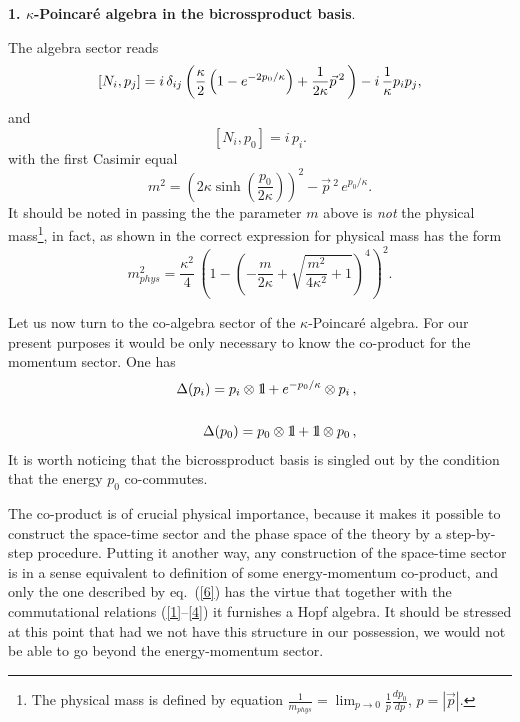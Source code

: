 \documentclass [prd,twocolumn,nofootinbib,showpacs]  {revtex4}
\def\bbbone{{\mathchoice {\rm 1\mskip-4mu l} {\rm 1\mskip-4mu l}
{\rm 1\mskip-4.5mu l} {\rm 1\mskip-5mu l}}}
\begin{document}
\noindent
{\bf 1. $\kappa$-Poincar\'e algebra in the bicrossproduct basis}.
\newline

The algebra sector reads
\begin{equation}\label{3}
   \left[N_{i}, p_{j}\right] = i\,  \delta_{ij}
 \left( {\kappa\over 2} \left(
 1 -e^{-2{p_{0}/ \kappa}}
\right) + {1\over 2\kappa} \vec{p}\,{}^{ 2}\, \right) - i\,
{1\over \kappa} p_{i}p_{j} ,
\end{equation}
and
\begin{equation}\label{4}
  \left[N_{i},p_{0}\right] = i\, p_{i}.
\end{equation}
with the first Casimir equal
\begin{equation}\label{5}
 m^2 = \left(2\kappa \sinh \left(\frac{p_0}{2\kappa}\right)\right)^2 - \vec{p}\,{}^2\, e^{p_0/\kappa}.
\end{equation}
It should be noted in passing the the parameter $m$ above is {\em
not} the  physical mass\footnote{The physical mass is defined by
equation
$\frac{1}{m_{phys}}=\lim_{p\rightarrow0}\frac{1}{p}\frac{dp_0}{dp}$,
$p =|\vec{p}|$. }, in fact, as shown in \cite{juse} the correct
expression for physical mass has the form
$$
{m^2_{phys}}=\frac{\kappa^2}{4}\, \left(1-\left(-\frac{m}{2\kappa} +
\sqrt{\frac{m^2}{4\kappa^2} +1}\right)^4\right)^2.
$$

Let us now turn to the co-algebra sector of the
$\kappa$-Poincar\'e algebra.  For our present purposes it would be
only necessary to know the co-product  for the momentum sector.
One has
\begin{eqnarray}
\displaystyle
&& \Delta(p_{i}) = p_{i}\otimes \bbbone +
e^{-{p_{0}/ \kappa}} \otimes p_{i}\, ,
\cr\cr
\displaystyle
&& \Delta(p_{0}) = p_{0}\otimes \bbbone +  \bbbone \otimes p_{0}\, ,
\label{6}
\end{eqnarray}
It is worth noticing that the bicrossproduct basis is singled out
by the  condition that the energy $p_0$ co-commutes.

The co-product is of crucial physical importance, because it makes
it possible to  construct the space-time sector and the phase
space of the theory by a step-by-step procedure.  Putting it
another way, any construction of the space-time sector is in a
sense equivalent to definition of some energy-momentum co-product,
and only the one described by eq.~(\ref{6}) has the virtue that
together with the commutational relations (\ref{1}--\ref{4}) it
furnishes a Hopf algebra. It should be stressed at this point that
had we not have this structure in our possession, we would not be
able to go beyond the energy-momentum sector.
\end{document}
